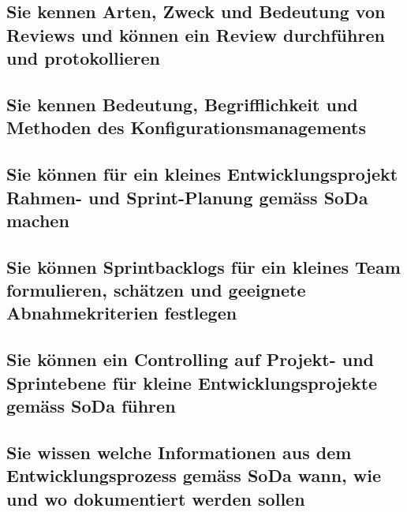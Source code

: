 \subsection{Sie kennen Arten, Zweck und Bedeutung von Reviews und können ein Review durchführen und protokollieren}
\subsection{Sie kennen Bedeutung, Begrifflichkeit und Methoden des Konfigurationsmanagements}
\subsection{Sie können für ein kleines Entwicklungsprojekt Rahmen- und Sprint-Planung gemäss SoDa machen}
\subsection{Sie können Sprintbacklogs für ein kleines Team formulieren, schätzen und geeignete Abnahmekriterien festlegen}
\subsection{Sie können ein Controlling auf Projekt- und Sprintebene für kleine Entwicklungsprojekte gemäss SoDa führen}
\subsection{Sie wissen welche Informationen aus dem Entwicklungsprozess gemäss SoDa wann, wie und wo dokumentiert werden sollen}